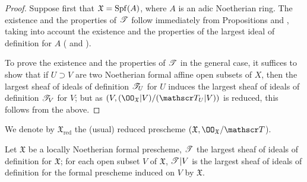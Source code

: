 \begin{proof}
\label{proof-1.10.5.4}
Suppose first that $\mathfrak{X}=\operatorname{Spf}(A)$, where $A$ is an adic Noetherian ring.
The existence and the properties of $\mathscr{T}$ follow immediately from Propositions  and , taking into account the existence and the properties of the largest ideal of definition for $A$ ( and ).

To prove the existence and the properties of $\mathscr{T}$ in the general case, it suffices to show that if $U\supset V$ are two Noetherian formal affine open subsets of $X$, then the largest sheaf of ideals of definition $\mathscr{T}_U$ for $U$ induces the largest sheaf of ideals of definition $\mathscr{T}_V$ for $V$; but as $(V,(\OO_\mathfrak{X}|V)/(\sh{T}_U|V))$ is reduced, this follows from the above.
\end{proof}

We denote by $\mathfrak{X}_\text{red}$ the (usual) reduced prescheme $(\mathfrak{X},\OO_\mathfrak{X}/\sh{T}$).

\begin{cor}[10.5.5]
\label{1.10.5.5}
Let $\mathfrak{X}$ be a locally Noetherian formal prescheme, $\mathscr{T}$ the largest sheaf of ideals of definition for $\mathfrak{X}$; for each open subset $V$ of $\mathfrak{X}$, $\mathscr{T}|V$ is the largest sheaf of ideals of definition for the formal prescheme induced on $V$ by $\mathfrak{X}$.
\end{cor}

